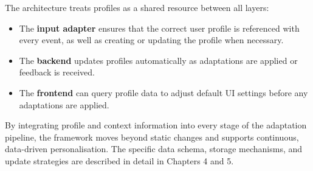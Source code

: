 \documentclass[openany]{book}
\begin{document}
The architecture treats profiles as a shared resource between all layers:
\begin{itemize}
    \item The \textbf{input adapter} ensures that the correct user profile is referenced with every event, as well as creating or updating the profile when necessary.
    \item The \textbf{backend} updates profiles automatically as adaptations are applied or feedback is received.
    \item The \textbf{frontend} can query profile data to adjust default UI settings before any adaptations are applied.
\end{itemize}
By integrating profile and context information into every stage of the adaptation pipeline, the framework moves beyond static changes and supports continuous, data-driven personalisation. The specific data schema, storage mechanisms, and update strategies are described in detail in Chapters 4 and 5.
\end{document}
